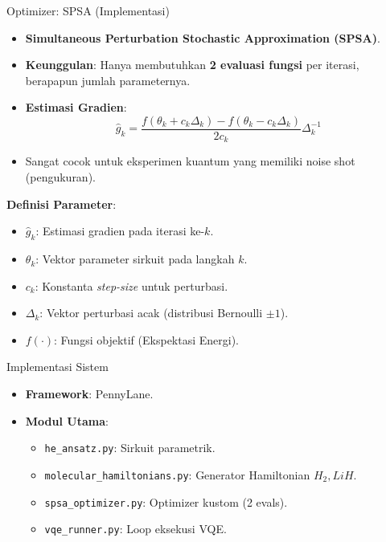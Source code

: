 \documentclass[aspectratio=169, 10pt]{beamer}
\begin{document}
\begin{frame}{Optimizer: SPSA (Implementasi)}
    \begin{itemize}
        \item \textbf{Simultaneous Perturbation Stochastic Approximation (SPSA)}.
        \item \textbf{Keunggulan}: Hanya membutuhkan \textbf{2 evaluasi fungsi} per iterasi, berapapun jumlah parameternya.
        \item \textbf{Estimasi Gradien}:
        \begin{equation}
            \hat{g}_k = \frac{f(\theta_k + c_k \Delta_k) - f(\theta_k - c_k \Delta_k)}{2 c_k} \Delta_k^{-1}
        \end{equation}
        \item Sangat cocok untuk eksperimen kuantum yang memiliki noise shot (pengukuran).
    \end{itemize}
    \vspace{0.3cm}
    \textbf{Definisi Parameter}:
    \footnotesize
    \begin{itemize}
        \item $\hat{g}_k$: Estimasi gradien pada iterasi ke-$k$.
        \item $\theta_k$: Vektor parameter sirkuit pada langkah $k$.
        \item $c_k$: Konstanta \textit{step-size} untuk perturbasi.
        \item $\Delta_k$: Vektor perturbasi acak (distribusi Bernoulli $\pm 1$).
        \item $f(\cdot)$: Fungsi objektif (Ekspektasi Energi).
    \end{itemize}
\end{frame}

\begin{frame}{Implementasi Sistem}
    \begin{itemize}
        \item \textbf{Framework}: PennyLane.
        \item \textbf{Modul Utama}:
        \begin{itemize}
            \item \texttt{he\_ansatz.py}: Sirkuit parametrik.
            \item \texttt{molecular\_hamiltonians.py}: Generator Hamiltonian $H_2, LiH$.
            \item \texttt{spsa\_optimizer.py}: Optimizer kustom (2 evals).
            \item \texttt{vqe\_runner.py}: Loop eksekusi VQE.
        \end{itemize}
    \end{itemize}
\end{frame}
\end{document}

